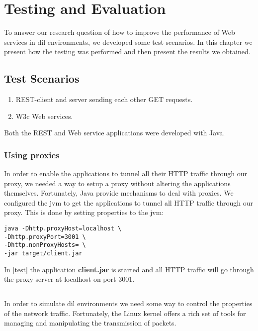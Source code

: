\chapter{Testing and Evaluation}

To answer our research question of how to improve the performance of Web
services in dil environments, we developed some test scenarios. In this chapter
we present how the testing was performed and then present the results we
obtained.

\section{Test Scenarios}
\begin{enumerate}
    \item REST-client and server sending each other GET requests.
    \item W3c Web services.
\end{enumerate}

Both the REST and Web service applications were developed with Java.

\subsection{Using proxies}

In order to enable the applications to tunnel all their HTTP traffic through our
proxy, we needed a way to setup a proxy without altering the applications
themselves. Fortunately, Java provide mechanisms to deal with
proxies\cite{oracle-proxy}. We configured the \gls{jvm} to get the applications
to tunnel all HTTP traffic through our proxy. This is done by setting properties
to the \gls{jvm}:


\begin{lstlisting}[frame=single, caption="Setting a proxy on the \gls{jvm}", label=test]
java -Dhttp.proxyHost=localhost \
-Dhttp.proxyPort=3001 \
-Dhttp.nonProxyHosts= \
-jar target/client.jar
\end{lstlisting}

In \cref{test} the application \textbf{client.jar} is started and all HTTP
traffic will go through the proxy server at localhost on port 3001.


\section{\glsentrylong{netem}}

In order to simulate \gls{dil} environments we need some way to control the
properties of the network traffic. Fortunately, the Linux kernel offers a rich
set of tools for managing and manipulating the transmission of packets.

